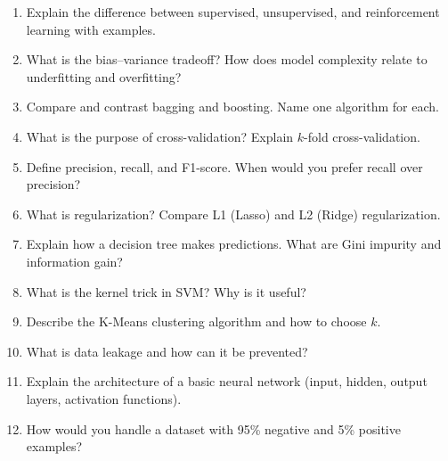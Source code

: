 \documentclass[11pt,a4paper]{article}
\begin{document}
\begin{enumerate}[leftmargin=*]
  \item Explain the difference between supervised, unsupervised, and reinforcement learning with examples.
  \item What is the bias--variance tradeoff? How does model complexity relate to underfitting and overfitting?
  \item Compare and contrast bagging and boosting. Name one algorithm for each.
  \item What is the purpose of cross-validation? Explain $k$-fold cross-validation.
  \item Define precision, recall, and F1-score. When would you prefer recall over precision?
  \item What is regularization? Compare L1 (Lasso) and L2 (Ridge) regularization.
  \item Explain how a decision tree makes predictions. What are Gini impurity and information gain?
  \item What is the kernel trick in SVM? Why is it useful?
  \item Describe the K-Means clustering algorithm and how to choose $k$.
  \item What is data leakage and how can it be prevented?
  \item Explain the architecture of a basic neural network (input, hidden, output layers, activation functions).
  \item How would you handle a dataset with 95\% negative and 5\% positive examples?
\end{enumerate}
\end{document}
